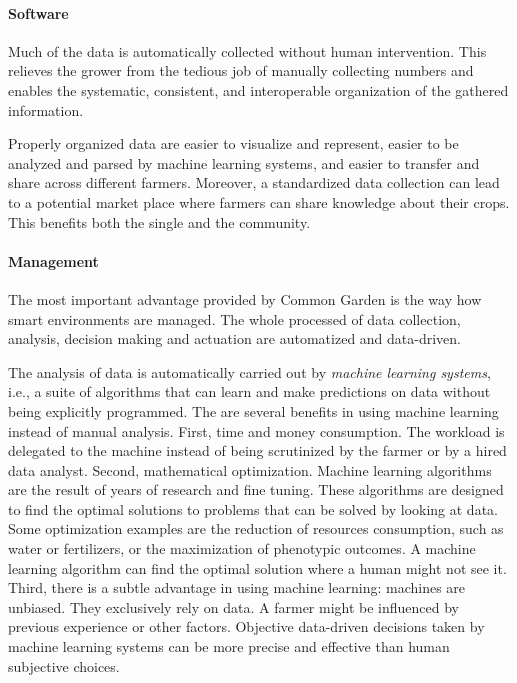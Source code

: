\paragraph{Software}
Much of the data is automatically collected without human intervention. This relieves the grower from the tedious job of manually collecting numbers and enables
the systematic, consistent, and interoperable organization of the gathered information. 


Properly organized data are easier to visualize and represent, easier to be analyzed and parsed by machine learning systems, and easier to transfer and share
across different farmers. Moreover, a standardized
data collection can lead to a potential market place
where farmers can share knowledge about their crops.
This benefits both the single and the community.

\paragraph{Management}
The most important advantage provided by Common Garden
is the way how smart environments are managed.
The whole processed of data collection, analysis, 
decision making and actuation are automatized and data-driven.


The analysis of data is automatically carried out by \emph{machine learning systems}, i.e.,
a suite of algorithms that can learn and make predictions on data without being explicitly programmed.
The are several benefits in using machine learning instead of manual analysis. 
First, time and money consumption. The workload is 
delegated to the machine instead of being scrutinized by the farmer or by a hired data analyst.
Second, mathematical optimization.
Machine learning algorithms are the result of years of
research and fine tuning. These algorithms are designed to find the optimal solutions to problems that can be solved by looking at data. Some optimization examples are the reduction of resources consumption, such 
as water or fertilizers, or the maximization of phenotypic outcomes. A machine learning algorithm can
find the optimal solution where a human might not see it.
Third, there is a subtle advantage in using machine learning: machines are unbiased.
They exclusively rely on data. A farmer might be influenced by previous experience or other factors.
Objective data-driven decisions taken by machine learning systems can be more precise and
effective than human subjective choices.

